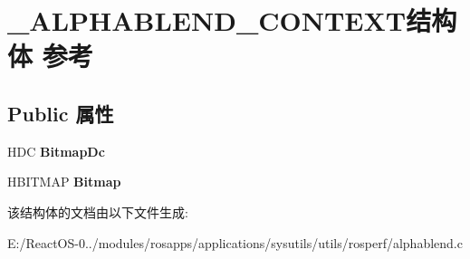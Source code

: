 \hypertarget{struct___a_l_p_h_a_b_l_e_n_d___c_o_n_t_e_x_t}{}\section{\+\_\+\+A\+L\+P\+H\+A\+B\+L\+E\+N\+D\+\_\+\+C\+O\+N\+T\+E\+X\+T结构体 参考}
\label{struct___a_l_p_h_a_b_l_e_n_d___c_o_n_t_e_x_t}
\subsection*{Public 属性}
\begin{DoxyCompactItemize}
\item 
\mbox{\label{struct___a_l_p_h_a_b_l_e_n_d___c_o_n_t_e_x_t_ad5a6970eca7312bb56ab53c7a95e597e}} 
H\+DC {\bfseries Bitmap\+Dc}
\item 
\mbox{\label{struct___a_l_p_h_a_b_l_e_n_d___c_o_n_t_e_x_t_a9739b039d16ea42c2037709b9cdf3800}} 
H\+B\+I\+T\+M\+AP {\bfseries Bitmap}
\end{DoxyCompactItemize}


该结构体的文档由以下文件生成\+:\begin{DoxyCompactItemize}
\item 
E\+:/\+React\+O\+S-\/0../modules/rosapps/applications/sysutils/utils/rosperf/alphablend.\+c\end{DoxyCompactItemize}
